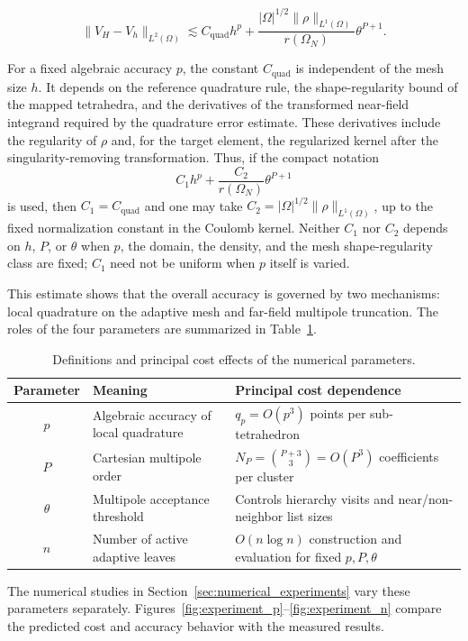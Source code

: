 \documentclass[a4paper,10pt]{article}
\begin{document}
\[
\lVert V_H - V_h\rVert_{L^2(\Omega)}
\lesssim
C_{\mathrm{quad}}h^p
+
\frac{|\Omega|^{1/2}\|\rho\|_{L^1(\Omega)}}{r(\Omega_N)}
\theta^{P+1}.
\]

For a fixed algebraic accuracy \(p\), the constant
\(C_{\mathrm{quad}}\) is independent of the mesh size \(h\).  It depends
on the reference quadrature rule, the shape-regularity bound of the mapped
tetrahedra, and the derivatives of the transformed near-field integrand
required by the quadrature error estimate.  These derivatives include the
regularity of \(\rho\) and, for the target element, the regularized kernel
after the singularity-removing transformation.  Thus, if the compact
notation
\[
C_1h^p+\frac{C_2}{r(\Omega_N)}\theta^{P+1}
\]
is used, then \(C_1=C_{\mathrm{quad}}\) and one may take
\(C_2=|\Omega|^{1/2}\|\rho\|_{L^1(\Omega)}\), up to the fixed
normalization constant in the Coulomb kernel.  Neither \(C_1\) nor \(C_2\)
depends on \(h\), \(P\), or \(\theta\) when \(p\), the domain, the density,
and the mesh shape-regularity class are fixed; \(C_1\) need not be uniform
when \(p\) itself is varied.

This estimate shows that the overall accuracy is governed by
two mechanisms: local quadrature on the adaptive mesh and far-field
multipole truncation.  The roles of the four parameters are
summarized in Table~\ref{tab:parameter_roles}.

\begin{table}[H]
\centering
\caption{Definitions and principal cost effects of the numerical
parameters.}
\label{tab:parameter_roles}
\begin{tabular}{c p{} p{}}
\toprule
Parameter & Meaning & Principal cost dependence\\
\midrule
\(p\) & Algebraic accuracy of local quadrature
& \(q_p=O(p^3)\) points per sub-tetrahedron\\
\(P\) & Cartesian multipole order
& \(N_P=\binom{P+3}{3}=O(P^3)\) coefficients per cluster\\
\(\theta\) & Multipole acceptance threshold
& Controls hierarchy visits and near/non-neighbor list sizes\\
\(n\) & Number of active adaptive leaves
& \(O(n\log n)\) construction and evaluation for fixed \(p,P,\theta\)\\
\bottomrule
\end{tabular}
\end{table}

The numerical studies in Section~\ref{sec:numerical_experiments} vary
these parameters separately.
Figures~\ref{fig:experiment_p}--\ref{fig:experiment_n} compare the
predicted cost and accuracy behavior with the measured results.
\end{document}
